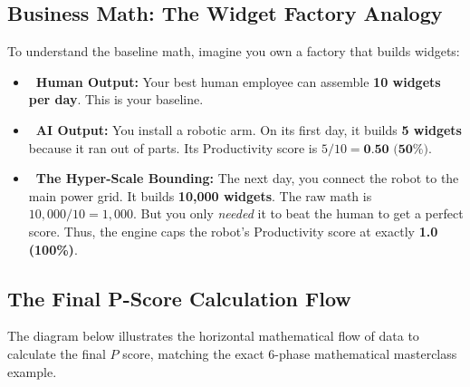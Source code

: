 \documentclass[11pt,a4paper]{article}
\begin{document}
\vspace{0.5cm}

\subsection{Business Math: The Widget Factory Analogy}

\begin{tcolorbox}[enhanced, colback=dpicloud!10!white, colframe=dpicloud, title={\textbf{\faLightbulb\ The Widget Factory Analogy}}, fonttitle=\bfseries\large, boxrule=1pt, arc=2mm, drop shadow]
To understand the baseline math, imagine you own a factory that builds widgets:

\vspace{0.2cm}
\begin{itemize}
    \item \textbf{\color{dpiblue}\faUserTie\ Human Output:} Your best human employee can assemble \textbf{10 widgets per day}. This is your baseline.
    \item \textbf{\color{dpigreen}\faRobot\ AI Output:} You install a robotic arm. On its first day, it builds \textbf{5 widgets} because it ran out of parts. Its Productivity score is $5 / 10 = \textbf{0.50 (50\%)}$.
    \item \textbf{\color{dpired}\faBalanceScale\ The Hyper-Scale Bounding:} The next day, you connect the robot to the main power grid. It builds \textbf{10,000 widgets}. The raw math is $10,000 / 10 = 1,000$. But you only \textit{needed} it to beat the human to get a perfect score. Thus, the engine caps the robot's Productivity score at exactly \textbf{1.0 (100\%)}.
\end{itemize}
\end{tcolorbox}

\newpage

\subsection{The Final P-Score Calculation Flow}

The diagram below illustrates the horizontal mathematical flow of data to calculate the final $P$ score, matching the exact 6-phase mathematical masterclass example.
\end{document}
